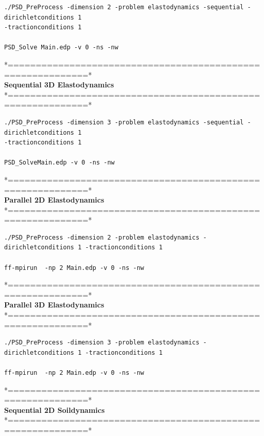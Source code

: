 \begin{lstlisting}[style=Linux]
./PSD_PreProcess -dimension 2 -problem elastodynamics -sequential -dirichletconditions 1  
-tractionconditions 1 

PSD_Solve Main.edp -v 0 -ns -nw
\end{lstlisting}
*============================================================*\\
\textbf{ Sequential 3D Elastodynamics}  \\                    
*============================================================*\\

\begin{lstlisting}[style=Linux]
./PSD_PreProcess -dimension 3 -problem elastodynamics -sequential -dirichletconditions 1 
-tractionconditions 1 

PSD_SolveMain.edp -v 0 -ns -nw
\end{lstlisting}
*============================================================*\\
\textbf{ Parallel 2D Elastodynamics}   \\                   
*============================================================*\\

\begin{lstlisting}[style=Linux]
./PSD_PreProcess -dimension 2 -problem elastodynamics -dirichletconditions 1 -tractionconditions 1 

ff-mpirun  -np 2 Main.edp -v 0 -ns -nw
\end{lstlisting}
*============================================================*\\
\textbf{ Parallel 3D Elastodynamics } \\                    
*============================================================*\\

\begin{lstlisting}[style=Linux]
./PSD_PreProcess -dimension 3 -problem elastodynamics -dirichletconditions 1 -tractionconditions 1 

ff-mpirun  -np 2 Main.edp -v 0 -ns -nw
\end{lstlisting}
*============================================================*\\
\textbf{ Sequential 2D Soildynamics }    \\                   
*============================================================*\\

